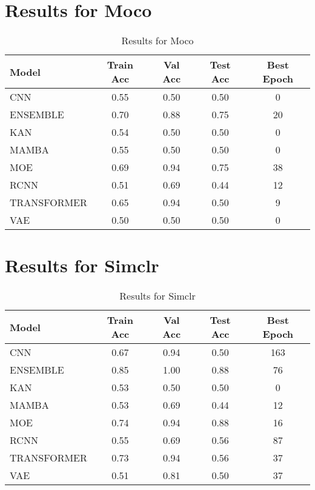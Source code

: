 \documentclass{article}
\begin{document}
\section*{Results for Moco}
\begin{table}[h!]
\centering
\begin{tabular}{lcccc}
\toprule
Model & Train Acc & Val Acc & Test Acc & Best Epoch \\
\midrule
CNN & 0.55 & 0.50 & 0.50 & 0 \\
ENSEMBLE & 0.70 & 0.88 & 0.75 & 20 \\
KAN & 0.54 & 0.50 & 0.50 & 0 \\
MAMBA & 0.55 & 0.50 & 0.50 & 0 \\
MOE & 0.69 & 0.94 & 0.75 & 38 \\
RCNN & 0.51 & 0.69 & 0.44 & 12 \\
TRANSFORMER & 0.65 & 0.94 & 0.50 & 9 \\
VAE & 0.50 & 0.50 & 0.50 & 0 \\
\bottomrule
\end{tabular}
\caption{Results for Moco}
\label{tab:moco}
\end{table}

\section*{Results for Simclr}
\begin{table}[h!]
\centering
\begin{tabular}{lcccc}
\toprule
Model & Train Acc & Val Acc & Test Acc & Best Epoch \\
\midrule
CNN & 0.67 & 0.94 & 0.50 & 163 \\
ENSEMBLE & 0.85 & 1.00 & 0.88 & 76 \\
KAN & 0.53 & 0.50 & 0.50 & 0 \\
MAMBA & 0.53 & 0.69 & 0.44 & 12 \\
MOE & 0.74 & 0.94 & 0.88 & 16 \\
RCNN & 0.55 & 0.69 & 0.56 & 87 \\
TRANSFORMER & 0.73 & 0.94 & 0.56 & 37 \\
VAE & 0.51 & 0.81 & 0.50 & 37 \\
\bottomrule
\end{tabular}
\caption{Results for Simclr}
\label{tab:simclr}
\end{table}
\end{document}
